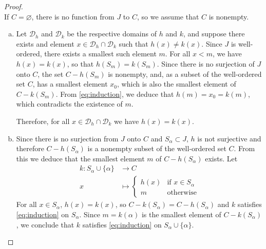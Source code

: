 \documentclass[11pt,a4paper,twoside]{article}
\theoremstyle{definition}
\theoremstyle{plain}
\begin{document}
\begin{proof} ~\\

  If $C = \varnothing$, there is no function from $J$ to $C$, so we assume that $C$ is nonempty.

  \begin{enumerate}[(a)]

  \item \label{lemma:unicity}
    Let $\mathscr{D}_h$ and $\mathscr{D}_k$ be the respective domains of $h$ and $k$,
    and suppose there exists and element $x \in \mathscr{D}_h \cap \mathscr{D}_k$ such that $h ( x ) \neq k ( x )$.
    Since $J$ is well-ordered, there exists a smallest such element $m$. For all $x < m$, we have $h ( x ) = k ( x )$,
    so that $h ( S_m ) = k ( S_m )$. Since there is no surjection of $J$ onto $C$, the set $C - h ( S_m )$ is nonempty,
    and, as a subset of the well-ordered set $C$, has a smallest element $x_0$, which is also the smallest element of $C - k ( S_m )$.
    From \eqref{eq:induction}, we deduce that $h ( m ) = x_0 = k ( m )$, which contradicts the existence of $m$.

    Therefore, for all $x \in \mathscr{D}_h \cap \mathscr{D}_k$ we have $h ( x ) = k ( x )$.

  \item \label{lemma:inductive_case}
    Since there is no surjection from $J$ onto $C$ and $S_\alpha \subset J$, $h$ is not surjective and therefore
    $C - h ( S_\alpha )$ is a nonempty subset of the well-ordered set $C$. From this we deduce that the smallest element $m$
    of $C - h ( S_\alpha )$ exists. Let
    \begin{align*}
      k : S_\alpha \cup \{ \alpha \} &\to C \\
      x &\mapsto \begin{cases}
        h ( x ) &\text{if } x \in S_\alpha \\
        m &\text{otherwise}
      \end{cases}
    \end{align*}
    For all $x \in S_\alpha$, $h ( x ) = k ( x )$, so $C - k ( S_\alpha ) = C - h ( S_\alpha )$ and $k$ satisfies \eqref{eq:induction}
    on $S_\alpha$. Since $m = k ( \alpha )$ is the smallest element of $C - k ( S_\alpha )$, we conclude that $k$
    satisfies \eqref{eq:induction} on $S_\alpha \cup \{ \alpha \}$.


\end{enumerate}
\end{proof}
\end{document}
